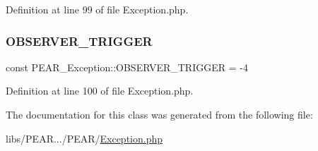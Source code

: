 Definition at line 99 of file Exception.\+php.

\mbox{\label{classPEAR__Exception_a0bf6d43a80c7f3bc2c7cfae062ff4477}} 
\subsubsection{\texorpdfstring{O\+B\+S\+E\+R\+V\+E\+R\+\_\+\+T\+R\+I\+G\+G\+ER}{OBSERVER\_TRIGGER}}
{\footnotesize\ttfamily const P\+E\+A\+R\+\_\+\+Exception\+::\+O\+B\+S\+E\+R\+V\+E\+R\+\_\+\+T\+R\+I\+G\+G\+ER = -\/4}



Definition at line 100 of file Exception.\+php.



The documentation for this class was generated from the following file\+:\begin{DoxyCompactItemize}
\item 
libs/\+P\+E\+A\+R.../\+P\+E\+A\+R/\hyperlink{PEAR_2Exception_8php}{Exception.\+php}\end{DoxyCompactItemize}
